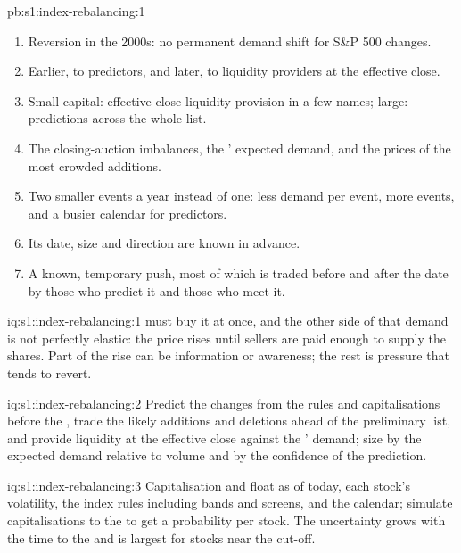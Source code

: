 \begin{solution}{pb:s1:index-rebalancing:1}
\begin{enumerate}
sixty days before); the announcement trade earns 2.2\% to 5.7\% per event as the tracked share rises from 5\% to 30\% with a fifth taken early, and 0.4\% to
1.3\% with four fifths taken early.
\item Reversion in the 2000s: no permanent demand shift for S\&P 500 changes.
\item Earlier, to predictors, and later, to liquidity providers at the effective close.
\item Small capital: effective-close liquidity provision in a few names; large: predictions across the whole list.
\item The closing-auction imbalances, the ' expected demand, and the prices of the most crowded additions.
\item Two smaller events a year instead of one: less demand per event, more events, and a busier calendar for predictors.
\item Its date, size and direction are known in advance.
\item A known, temporary push, most of which is traded before and after the date by those who predict it and those who meet it.
\end{enumerate}
\end{solution}

\begin{solution}{iq:s1:index-rebalancing:1}
 must buy it at once, and the other side of that demand is not perfectly elastic: the price rises until sellers are paid enough to supply the
shares. Part of the rise can be information or awareness; the rest is pressure that tends to revert.
\end{solution}

\begin{solution}{iq:s1:index-rebalancing:2}
Predict the changes from the rules and capitalisations before the , trade the likely additions and deletions ahead of the preliminary list, and
provide liquidity at the effective close against the ' demand; size by the expected demand relative to volume and by the confidence of the
prediction.
\end{solution}

\begin{solution}{iq:s1:index-rebalancing:3}
Capitalisation and float as of today, each stock's volatility, the index rules including bands and screens, and the calendar; simulate capitalisations to the
 to get a probability per stock. The uncertainty grows with the time to the  and is largest for stocks near the cut-off.
\end{solution}

